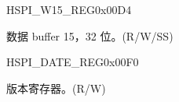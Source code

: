 \begin{register}{H}{SPI\_W15\_REG}{0x00D4}\label{regdesc:SPIW15REG}
%
\regnewline%
\begin{regdesc}\begin{reglist}
\label{fielddesc:SPIBUF15}\item [SPI\_BUF15] 数据 buffer 15，32 位。(R/W/SS)
\end{reglist}\end{regdesc}
\end{register}


\begin{register}{H}{SPI\_DATE\_REG}{0x00F0}\label{regdesc:SPIDATEREG}
%
%
\regnewline%
\begin{regdesc}\begin{reglist}
\label{fielddesc:SPIDATE}\item [SPI\_DATE] 版本寄存器。(R/W)
\end{reglist}\end{regdesc}
\end{register}
